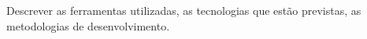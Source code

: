 \justify

\hspace{0.5cm} Descrever as ferramentas utilizadas, as tecnologias que estão previstas, as metodologias de desenvolvimento.